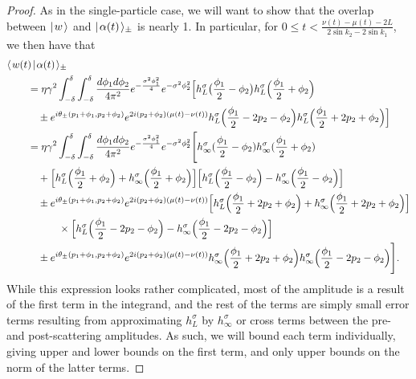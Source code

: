 \documentclass[../thesis-main/thesis-main]{subfiles}
\begin{document}
\begin{proof}
As in the single-particle case, we will want to show that the overlap between $|\mspace{2mu} w \mspace{2mu} \rangle$ and $|\mspace{2mu} \alpha(t) \mspace{2mu} \rangle_\pm$ is nearly 1.  In particular, for $0 \leq t < \frac{\nu(t) - \mu(t) - 2 L}{2 \sin k_2 - 2 \sin k_1}$, we then have that
\begin{align}
  &\langle\mspace{2mu} w(t) \mspace{2mu} | \mspace{2mu} \alpha(t)\mspace{2mu} \rangle_\pm \nonumber\\
  &\qquad= \eta \gamma^2  \int_{-\delta}^\delta \int_{-\delta}^\delta \frac{d\phi_1 d \phi_2}{4\pi^2}  e^{-\frac{\sigma^2 \phi_1^2}{4}}  e^{- \sigma^2 \phi_2^2}\Big[h_L^\sigma \big(\frac{\phi_1}{2} - \phi_2 \big) h_L^\sigma\Big( \frac{\phi_1}{2} + \phi_2 \Big) \nonumber\\
  & \qquad \quad\pm e^{ i \theta_{\pm}(p_1+\phi_1, p_2+\phi_2)} e^{ 2 i( p_2 + \phi_2)(\mu(t) - \nu(t))} h_L^\sigma\Big(\frac{\phi_1}{2} - 2 p_2 - \phi_2\Big) h_L^\sigma\Big(\frac{\phi_1}{2}+ 2 p_2 + \phi_2\Big)\Big]\\
  & \qquad = \eta\gamma^2 \int_{-\delta}^\delta \int_{-\delta}^\delta \frac{d\phi_1 d\phi_2}{4\pi^2} e^{- \frac{\sigma^2 \phi_1^2}{4}}e^{-\sigma^2 \phi_2^2} \Bigg[ h_\infty^\sigma(\frac{\phi_1}{2} - \phi_{2} ) h_{\infty}^\sigma ( \frac{\phi_1}{2} + \phi_2) \nonumber\\
  &\qquad\quad 
   + \Big[h_L^{\sigma} \Big(\frac{\phi_1}{2} + \phi_2 \Big)  + h_\infty^\sigma \Big(\frac{\phi_1}{2} + \phi_2 \Big)\Big] \Big[ h_{L}^\sigma\Big(\frac{\phi_1}{2} - \phi_2 \Big) - h_\infty^\sigma\Big(\frac{\phi_1}{2} - \phi_2\Big)\Big]\nonumber\\
   &\qquad \quad\pm e^{ i \theta_{\pm}(p_1+\phi_1, p_2+\phi_2)} e^{ 2 i( p_2 + \phi_2)(\mu(t) - \nu(t))}  \Big[h_L^{\sigma} \Big(\frac{\phi_1}{2} + 2p_2 +\phi_2 \Big)  + h_\infty^\sigma \Big(\frac{\phi_1}{2} + 2p_2+ \phi_2 \Big)\Big] \nonumber\\
   &\qquad \quad \qquad \times\Big[ h_{L}^\sigma\Big(\frac{\phi_1}{2} -2p_2 - \phi_2 \Big) - h_\infty^\sigma\Big(\frac{\phi_1}{2} -2p_2- \phi_2\Big)\Big]\nonumber\\
   &\qquad \quad\pm e^{ i \theta_{\pm}(p_1+\phi_1, p_2+\phi_2)} e^{ 2 i( p_2 + \phi_2)(\mu(t) - \nu(t))}h_\infty^{\sigma} \Big(\frac{\phi_1}{2} + 2p_2 +\phi_2 \Big) h_\infty^{\sigma} \Big(\frac{\phi_1}{2} - 2p_2 -\phi_2 \Big) \Bigg].
\end{align}
While this expression looks rather complicated, most of the amplitude is a result of the first term in the integrand, and the rest of the terms are simply small error terms resulting from approximating $h_L^\sigma$ by $h_\infty^\sigma$ or cross terms between the pre- and post-scattering amplitudes.  As such, we will bound each term individually, giving upper and lower bounds on the first term, and only upper bounds on the norm of the latter terms.


\end{proof}
\end{document}
